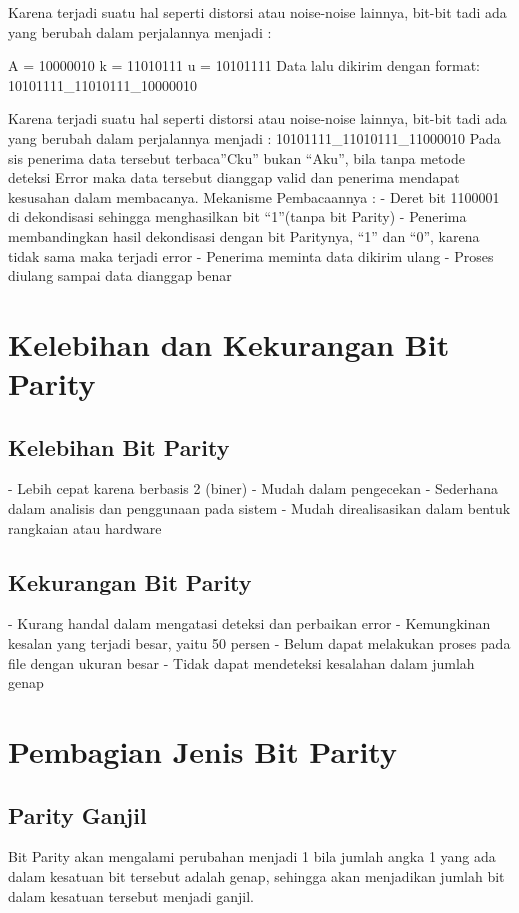 Karena terjadi suatu hal seperti distorsi atau noise-noise lainnya, bit-bit tadi ada yang berubah dalam perjalannya menjadi :


A = 10000010
k = 11010111
u = 10101111
Data lalu dikirim dengan format: 10101111_11010111_10000010

Karena terjadi suatu hal seperti distorsi atau noise-noise lainnya, bit-bit tadi ada yang berubah dalam perjalannya menjadi :
10101111_11010111_11000010
Pada sis penerima data tersebut terbaca”Cku” bukan “Aku”, bila tanpa metode deteksi Error maka data tersebut dianggap valid dan penerima mendapat kesusahan dalam membacanya.
Mekanisme Pembacaannya :
-          Deret bit 1100001 di dekondisasi sehingga menghasilkan bit “1”(tanpa bit Parity)
-          Penerima membandingkan hasil dekondisasi dengan bit Paritynya, “1” dan “0”, karena tidak sama maka terjadi error
-          Penerima meminta data dikirim ulang
-          Proses diulang sampai data dianggap benar




\section{Kelebihan dan Kekurangan Bit Parity}
\subsection{Kelebihan Bit Parity}
-	Lebih cepat karena berbasis 2 (biner)
-   Mudah dalam pengecekan
-   Sederhana dalam analisis dan penggunaan pada sistem
-   Mudah direalisasikan dalam bentuk rangkaian atau hardware

\subsection{Kekurangan Bit Parity}
-   Kurang handal dalam mengatasi deteksi dan perbaikan error
-   Kemungkinan kesalan yang terjadi besar, yaitu 50 persen
-   Belum dapat melakukan proses pada file dengan ukuran besar
-   Tidak dapat mendeteksi kesalahan dalam jumlah genap



\section{Pembagian Jenis Bit Parity}
\subsection{Parity Ganjil}
Bit Parity akan mengalami perubahan menjadi 1 bila jumlah angka 1  yang ada dalam kesatuan bit tersebut adalah genap, sehingga akan menjadikan jumlah bit dalam kesatuan tersebut menjadi ganjil.
 
